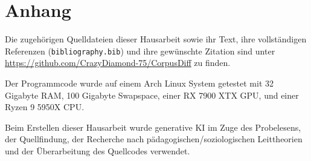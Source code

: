 \printbibliography[heading=bibintoc]

\vfill

\section*{Anhang}
Die zugehörigen Quelldateien dieser Hausarbeit sowie ihr Text, ihre vollständigen Referenzen (\lstinline|bibliography.bib|) und ihre gewünschte Zitation sind unter \url{https://github.com/CrazyDiamond-75/CorpusDiff} zu finden.

Der Programmcode wurde auf einem Arch Linux System getestet mit 32 Gigabyte RAM, 100 Gigabyte Swapspace, einer RX 7900 XTX GPU, und einer Ryzen 9 5950X CPU.

Beim Erstellen dieser Hausarbeit wurde generative KI im Zuge des Probelesens, der Quellfindung, der Recherche nach pädagogischen/soziologischen Leittheorien und der Überarbeitung des Quellcodes verwendet.

